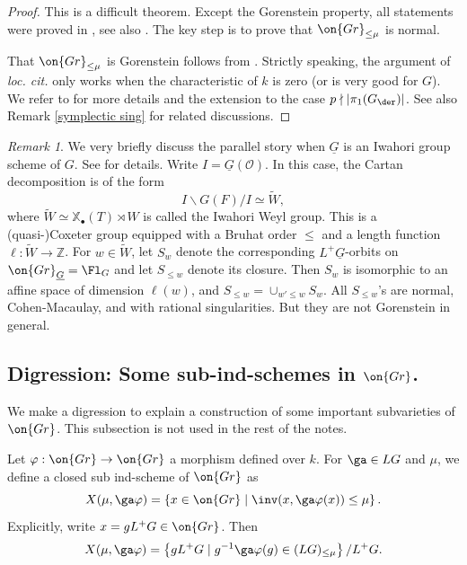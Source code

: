 \documentclass[]{pcmi}
\theoremstyle{plain}
\theoremstyle{remark}
\newtheorem{rmk}[equation]{Remark}
\theoremstyle{definition}
\newcommand{\bZ}{{\mathbb Z}}
\newcommand{\mO}{{\mathcal O}}
\newcommand{\Gr}{{\on{Gr}}}
\def\xcoch{\mathbb{X}_\bullet}
\begin{document}
\begin{proof}
This is a difficult theorem. 
Except the Gorenstein property, all statements were proved in \cite[Theorem 8]{Fa}, see also \cite[Theorem 0.3]{PR}. The key step is to prove that $\Gr_{\leq \mu}$ is normal.

That $\Gr_{\leq \mu}$ is Gorenstein  follows from \cite[Equation (241)]{BD}. Strictly speaking, the argument of \emph{loc. cit.} only works when the characteristic of $k$ is zero (or is very good for $G$). We refer to \cite[Theorem 6.11]{Z10} for more details and the extension to the case $p\nmid |\pi_1(G_\der)|$. See also Remark \ref{symplectic sing} for related discussions.
\end{proof}




\begin{rmk}
We very briefly discuss the parallel story when $\underline G$ is an Iwahori group scheme of $G$. See \cite{Fa,PR} for details. Write $I=\underline G(\mO)$. In this case, the Cartan decomposition is of the form
\[I\backslash G(F)/I\simeq \widetilde W,\]
where $\widetilde W\simeq \xcoch(T)\rtimes W$ is called the Iwahori Weyl group. This is a (quasi-)Coxeter group equipped with a Bruhat order $\leq$ and a length function $\ell:\widetilde W\to\bZ$.
For $w\in \widetilde{W}$, let $S_w$ denote the corresponding $L^+\underline G$-orbits on $\Gr_{\underline G}=\Fl_G$ and let $S_{\leq w}$ denote its closure. Then $S_w$ is isomorphic to an affine space of dimension $\ell(w)$, and $S_{\leq w}=\cup_{w'\leq w}S_w$. All $S_{\leq w}$'s are normal, Cohen-Macaulay, and with rational singularities. But they are not Gorenstein in general.
\end{rmk}


\subsection{Digression: Some sub-ind-schemes in $\Gr$.}\label{digression}
We make a digression to explain a construction of some important subvarieties of $\Gr$. This subsection is not used in the rest of the notes.  

Let $\varphi: \Gr\to \Gr$ a morphism defined over $k$. For $\ga\in LG$ and $\mu$,
we define a closed sub ind-scheme of $\Gr$ as
\[X(\mu,\ga\varphi)=\left\{ x\in \Gr\mid \inv(x,\ga\varphi(x))\leq \mu\right\}.\]
Explicitly,
write $x=g L^+G\in \Gr$. Then
\[X(\mu,\ga\varphi)= \left\{g L^+G\mid g^{-1}\ga\varphi(g) \in (LG)_{\leq \mu}\right\}/L^+G.\]
\end{document}
